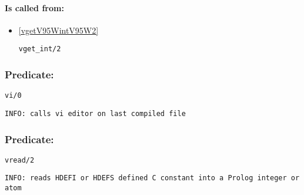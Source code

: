 \paragraph{Is called from:} 
\begin{itemize}
\item \ref{vgetV95WintV95W2} 
\begin{verbatim}
vget_int/2
\end{verbatim}

\end{itemize}

\subsubsection{Predicate:} \label{viV95W0}

\begin{verbatim}
vi/0
\end{verbatim}

{\small \begin{verbatim}
INFO: calls vi editor on last compiled file

\end{verbatim}}

\subsubsection{Predicate:} \label{vreadV95W2}

\begin{verbatim}
vread/2
\end{verbatim}

{\small \begin{verbatim}
INFO: reads HDEFI or HDEFS defined C constant into a Prolog integer or atom

\end{verbatim}}
